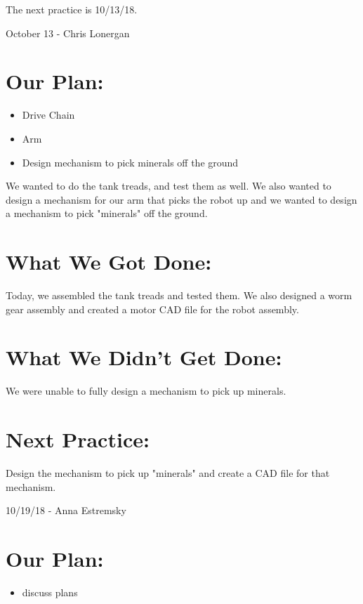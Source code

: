 \documentclass[12pt]{article}
\begin{document}
The next practice is 10/13/18. 

\newpage
\setcounter{section}{0}

October 13 - Chris Lonergan

\section{Our Plan:} 
\begin{itemize}
	\item Drive Chain
	\item Arm
	\item Design mechanism to pick minerals off the ground
\end{itemize}

We wanted to do the tank treads, and test them as well. We also wanted to design a mechanism for our arm that picks the robot up and we wanted to design a mechanism to pick "minerals" off the ground. 

\section{What We Got Done:} 

Today, we assembled the tank treads and tested them. We also designed a worm gear assembly and created a motor CAD file for the robot assembly. 


\section{What We Didn't Get Done:} 

We were unable to fully design a mechanism to pick up minerals.

\section{Next Practice:}
Design the mechanism to pick up "minerals" and create a CAD file for that mechanism.

\newpage
\setcounter{section}{0}

10/19/18 - Anna Estremsky

\section{Our Plan:} %
\begin{itemize}
	\item discuss plans
\end{itemize}
\end{document}
